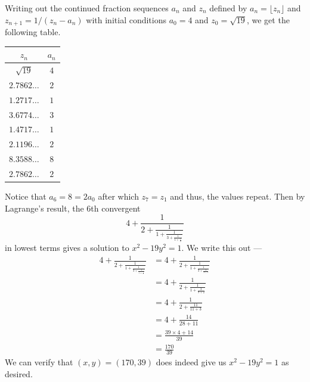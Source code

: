 \documentclass[12 pt, letterpaper]{hmcpset}
\begin{document}
\begin{solution}
	Writing out the continued fraction sequences $a_{n}$ and $z_{n}$ defined by $a_{n} = \lfloor z_{n} \rfloor$ and $z_{n + 1} = 1 / (z_{n} - a_{n})$ with initial conditions $a_{0} = 4$ and $z_{0} = \sqrt{19}$, we get the following table.
	\begin{center}
		\begin{tabular}{|c | c|}
			\hline
			$z_{n}$ & $a_{n}$ \\ \hline \hline
			$\sqrt{19}$ & $4$ \\ \hline
			$2.7862 \dots$ & $2$ \\ \hline
			$1.2717 \dots$ & $1$ \\ \hline
			$3.6774 \dots$ & $3$ \\ \hline
			$1.4717 \dots$ & $1$ \\ \hline
			$2.1196 \dots$ & $2$ \\ \hline 
			$8.3588 \dots$ & $8$ \\ \hline
			$2.7862 \dots$ & $2$ \\ \hline
		\end{tabular}
	\end{center}
	Notice that $a_{6} = 8 = 2 a_{0}$ after which $z_{7} = z_{1}$ and thus, the values repeat. Then by Lagrange's result, the $6$th convergent
	 \[
		4 + \frac{1}{2 + \frac{1}{1 + \frac{1}{3 + \frac{1}{1 + \frac{1}{2}}}}}
	\]
	in lowest terms gives a solution to $x^{2} - 19 y^{2} = 1$. We write this out ---
	\[
		\begin{split}
			4 + \frac{1}{2 + \frac{1}{1 + \frac{1}{3 + \frac{1}{1 + \frac{1}{2}}}}} & = 4 + \frac{1}{2 + \frac{1}{1 + \frac{1}{3 + \frac{2}{2 + 1}}}} \\
												& = 4 + \frac{1}{2 + \frac{1}{1 + \frac{3}{9 + 2}}} \\
												& = 4 + \frac{1}{2 + \frac{11}{11 + 3}} \\
												& = 4 + \frac{14}{28 + 11} \\
												& = \frac{39 \times 4 + 14}{39} \\
												& = \frac{170}{39}
		\end{split}
	\]
	We can verify that $(x, y) = (170, 39)$ does indeed give us $x^{2} - 19 y^{2} = 1$ as desired.
\end{solution}

\pagebreak
\end{document}
